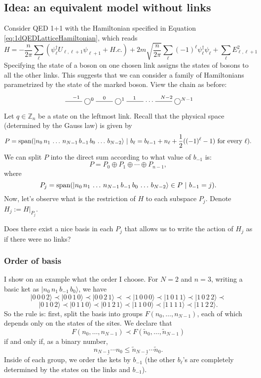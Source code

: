 	
	\subsection{Idea: an equivalent model without links}
	Consider QED 1+1 with the Hamiltonian specified in Equation \ref{eq:1dQEDLatticeHamiltonian}, which reads 
\[
	H=-\frac{n}{2\pi} \sum_\ell (\psi_\ell^\dagger U_{\ell,\ell+1}\psi_{\ell+1}+H.c.) + 2m\sqrt{\frac{n}{2\pi}}\sum_\ell (-1)^\ell \psi_\ell^\dagger\psi_\ell+  \sum_{\ell} E_{\ell,\ell+1}^2
\]
Specifying the state of a boson on one chosen link assigns the states of bosons to all the other links. This suggests that we can consider a family of Hamiltonians parametrized by the state of the marked boson. View the chain as before:
	\[
	\xymatrix{
	\ar@{-}[r]^{-1} & \bigcirc^0 \ar@{-}[r]^{0} &  \bigcirc^1 \ar@{-}[r]^{1} & \cdots & \ar@{-}[l]_{N-2} \bigcirc^{N-1}
	}
	\]
	Let $q \in \mathbb Z_n$ be a state on the leftmost link. Recall that the physical space (determined by the Gauss law) is given by
	\[
	P = \operatorname{span} ( |n_0\, n_1\, \ldots \, n_{N-1} \, b_{-1}\, b_0\, \ldots\, b_{N-2}\rangle \ | \ b_{\ell} =b_{\ell-1} + n_{\ell} + \frac{1}{2}((-1)^\ell-1) \ \text{for every} \ \ell).
	\]
	We can split $P$ into the direct sum according to what value of $b_{-1}$ is:
	\[
	P = P_0 \oplus P_1 \oplus \cdots \oplus P_{n-1},
	\]
	where
	\[
	P_j = \operatorname{span}( |n_0\, n_1\, \ldots \, n_{N-1} \, b_{-1}\, b_0\, \ldots\, b_{N-2}\rangle \in P \ | \ b_{-1} = j).
	\]
	Now, let's observe what is the restriction of $H$ to each subspace $P_j$. Denote $H_j := H|_{P_j}$.
\begin{idea}
Does there exist a nice basis in each $P_j$ that allows us to write the action of $H_j$ as if there were no links?
\end{idea}

\subsubsection{Order of basis}
I show on an example what the order I choose. For $N=2$ and $n=3$, writing a basic ket as $|n_0\, n_1\, b_{-1}\, b_0\rangle$, we have
\[
|0\, 0\, 0\, 2\rangle \prec |0\, 0\, 1\, 0\rangle \prec |0\, 0\, 2\, 1\rangle \prec 
\prec |1\, 0\, 0\, 0\rangle \prec |1\, 0\, 1\, 1\rangle \prec |1\, 0\, 2\, 2\rangle \prec
\]\[
 |0\, 1\, 0\, 2\rangle \prec |0\, 1\, 1\, 0\rangle \prec |0\,1\, 2\, 1\rangle \prec
|1\, 1\, 0\, 0\rangle \prec |1\, 1\, 1\, 1\rangle \prec |1\, 1\, 2\, 2\rangle.
\]
So the rule is: first, split the basis into groups $F(n_0,\ldots,n_{N-1})$, each of which depends only on the states of the sites. We declare that
\[
F(n_0,\ldots,n_{N-1}) \prec F(\tilde{n}_0,\ldots,\tilde{n}_{N-1})
\]
if and only if, as a binary number,
\[
\underline{n_{N-1}\cdots n_{0}} \leq \underline{\tilde{n}_{N-1}\cdots \tilde{n}_{0}}.
\]
Inside of each group, we order the kets by $b_{-1}$ (the other $b_{\ell}$'s are completely determined by the states on the links and $b_{-1}$).

